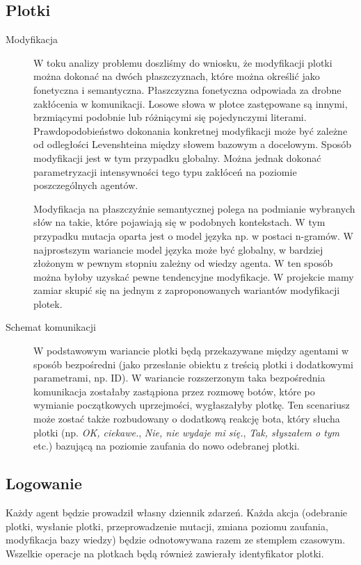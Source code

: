 \documentclass{article}
\begin{document}
	\subsection{Plotki}
	\begin{description}
		\item[Modyfikacja]
		W toku analizy problemu doszliśmy do wniosku, że modyfikacji plotki można dokonać na dwóch płaszczyznach, które można określić jako fonetyczna i semantyczna. Płaszczyzna fonetyczna odpowiada za drobne zakłócenia w komunikacji. Losowe słowa w plotce zastępowane są innymi, brzmiącymi podobnie lub różniącymi się pojedynczymi literami. Prawdopodobieństwo dokonania konkretnej modyfikacji może być zależne od odległości Levenshteina między słowem bazowym a docelowym. Sposób modyfikacji jest w tym przypadku globalny. Można jednak dokonać parametryzacji intensywności tego typu zakłóceń na poziomie poszczególnych agentów.
	
		Modyfikacja na płaszczyźnie semantycznej polega na podmianie wybranych słów na takie, które pojawiają się w podobnych kontekstach. W tym przypadku mutacja oparta jest o model języka np. w postaci n-gramów. W najprostszym wariancie model języka może być globalny, w bardziej złożonym w pewnym stopniu zależny od wiedzy agenta. W ten sposób można byłoby uzyskać pewne tendencyjne modyfikacje.
		W projekcie mamy zamiar skupić się na jednym z zaproponowanych wariantów modyfikacji plotek.
		\item[Schemat komunikacji]
	W podstawowym wariancie plotki będą przekazywane między agentami w sposób bezpośredni (jako przesłanie obiektu z treścią plotki i dodatkowymi parametrami, np. ID). W wariancie rozszerzonym taka bezpośrednia komunikacja zostałaby zastąpiona przez rozmowę botów, które po wymianie początkowych uprzejmości, wygłaszałyby plotkę. Ten scenariusz może zostać także rozbudowany o dodatkową reakcję bota, który słucha plotki (np. \textit{OK, ciekawe.}, \textit{Nie, nie wydaje mi się.}, \textit{Tak, słyszałem o tym} etc.) bazującą na poziomie zaufania do nowo odebranej plotki.
	\end{description}
	\subsection{Logowanie}
	Każdy agent będzie prowadził własny dziennik zdarzeń. Każda akcja (odebranie plotki, wysłanie plotki, przeprowadzenie mutacji, zmiana poziomu zaufania, modyfikacja bazy wiedzy) będzie odnotowywana razem ze stemplem czasowym. Wszelkie operacje na plotkach będą również zawierały identyfikator plotki.
	
\end{document}
